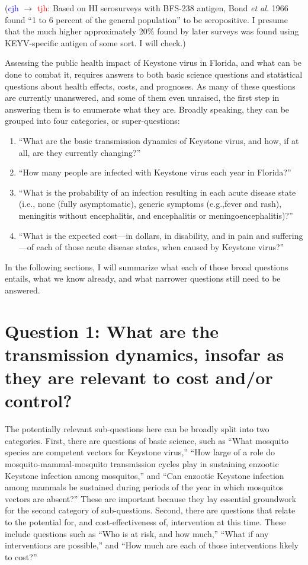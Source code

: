 \documentclass[12pt]{article}
\newcommand{\cjh}{\textcolor{blue}{cjh}}
\newcommand{\tjh}{\textcolor{red}{tjh}}
\newcommand{\msg}[3]{(#1 $\rightarrow$ #2: #3)}
\newcommand{\mct}[1]{\msg\cjh\tjh{#1}}
\begin{document}
        \mct{Based on HI serosurveys with BFS-238 antigen, Bond \textit{et al.} 1966 found ``1 to 6 percent of the general population'' to be seropositive. I presume that the much higher approximately 20\% found by later surveys was found using KEYV-specific antigen of some sort. I will check.}

        Assessing the public health impact of Keystone virus in Florida, and what can be done to combat it, requires answers to both basic science questions and statistical questions about health effects, costs, and prognoses. As many of these questions are currently unanswered, and some of them even unraised, the first step in answering them is to enumerate what they are. Broadly speaking, they can be grouped into four categories, or super-questions:
        \begin{enumerate}
            \item ``What are the basic transmission dynamics of Keystone virus, and how, if at all, are they currently changing?''
            \item ``How many people are infected with Keystone virus each year in Florida?''
            \item ``What is the probability of an infection resulting in each acute disease state (i.e., none (fully asymptomatic), generic symptoms (e.g.,fever and rash), meningitis without encephalitis, and encephalitis or meningoencephalitis)?''
            \item ``What is the expected cost---in dollars, in disability, and in pain and suffering---of each of those acute disease states, when caused by Keystone virus?''
        \end{enumerate}

        In the following sections, I will summarize what each of those broad questions entails, what we know already, and what narrower questions still need to be answered.

    \section[Transmission dynamics]{Question 1: What are the transmission dynamics, insofar as they are relevant to cost and/or control?}
        The potentially relevant sub-questions here can be broadly split into two categories. First, there are questions of basic science, such as ``What mosquito species are competent vectors for Keystone virus,'' ``How large of a role do mosquito-mammal-mosquito transmission cycles play in sustaining enzootic Keystone infection among mosquitos,'' and ``Can enzootic Keystone infection among mammals be sustained during periods of the year in which mosquitos vectors are absent?'' These are important because they lay essential groundwork for the second category of sub-questions. Second, there are questions that relate to the potential for, and cost-effectiveness of, intervention at this time. These include questions such as ``Who is at risk, and how much,'' ``What if any interventions are possible,'' and ``How much are each of those interventions likely to cost?''
\end{document}
